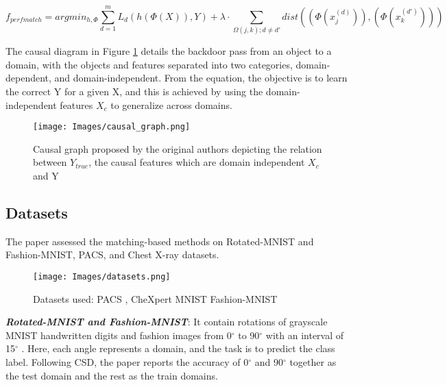 \[f_{perfmatch}=argmin_{h,\Phi}\sum\limits_{d=1}^m L_d(h(\Phi(X)),Y)+\lambda\cdot\sum\limits_{\Omega(j,k);d\neq d'}dist((\Phi(x_j^{(d)})),(\Phi(x_k^{(d')})))\]

The causal diagram in Figure \ref{fig:causal_graph} details the backdoor pass from an object to a domain, with the objects and features separated into two categories, domain-dependent, and domain-independent. From the equation, the objective is to learn the correct Y for a given X, and this is achieved by using the domain-independent features \(X_c\) to generalize across domains.


\begin{center}
    \begin{figure}[h!]
    \begin{center}
      \texttt{[image: Images/causal\_graph.png]}
      \caption{Causal graph proposed by the original authors \cite{domaingen2021} depicting the relation between \(Y_{true}\), the causal features which are domain independent \(X_c\) and Y}
      \label{fig:causal_graph}
      \end{center}
    \end{figure}
\end{center}



\subsection{Datasets}

The paper assessed the matching-based methods on Rotated-MNIST and Fashion-MNIST, PACS, and Chest X-ray datasets. 

\begin{center}
    \begin{figure}[h!]
    \begin{center}
      \texttt{[image: Images/datasets.png]}
      \caption{Datasets used: PACS \cite{DBLP:journals/corr/abs-1710-03077, ssdafcvt_PACS}, CheXpert \cite{chexpert} MNIST \cite{MNIST} Fashion-MNIST\cite{fashionMNIST}}
      \label{fig:datasets}
      \end{center}
    \end{figure}
\end{center}

\textbf{\textit{Rotated-MNIST and Fashion-MNIST}}: It contain rotations of grayscale MNIST handwritten digits and fashion images from 0$^{\circ}$ to 90$^{\circ}$ with an interval of 15$^{\circ}$ \cite{ghifary2015domain}. Here, each angle represents a domain, and the task is to predict the class label. Following CSD, the paper reports the accuracy of 0$^{\circ}$ and 90$^{\circ}$ together as the test domain and the rest as the train domains. 

